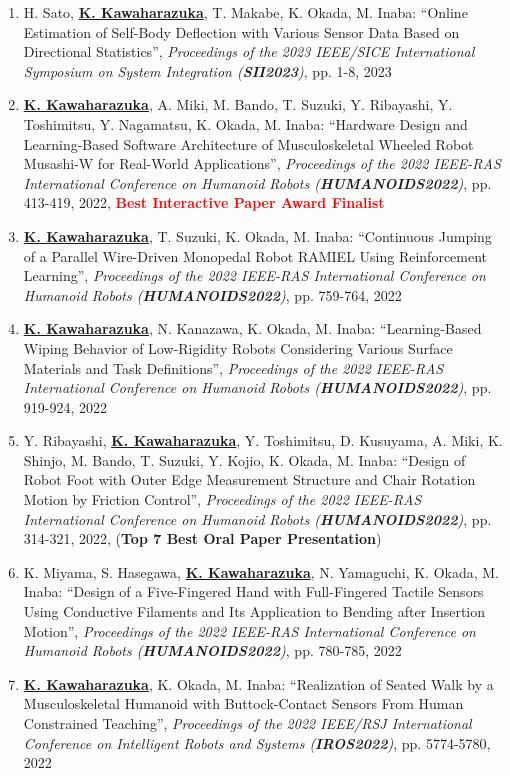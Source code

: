 \documentclass[letterpaper]{article}
\begin{document}
\begin{enumerate}
\item H. Sato, \underline{\textbf{K. Kawaharazuka}}, T. Makabe, K. Okada, M. Inaba: ``Online Estimation of Self-Body Deflection with Various Sensor Data Based on Directional Statistics'', \textit{Proceedings of the 2023 IEEE/SICE International Symposium on System Integration (\textit{\textbf{SII2023}})}, pp. 1-8, 2023
\item \underline{\textbf{K. Kawaharazuka}}, A. Miki, M. Bando, T. Suzuki, Y. Ribayashi, Y. Toshimitsu, Y. Nagamatsu, K. Okada, M. Inaba: ``Hardware Design and Learning-Based Software Architecture of Musculoskeletal Wheeled Robot Musashi-W for Real-World Applications'', \textit{Proceedings of the 2022 IEEE-RAS International Conference on Humanoid Robots (\textit{\textbf{HUMANOIDS2022}})}, pp. 413-419, 2022, \textbf{\textcolor{red}{Best Interactive Paper Award Finalist}}
\item \underline{\textbf{K. Kawaharazuka}}, T. Suzuki, K. Okada, M. Inaba: ``Continuous Jumping of a Parallel Wire-Driven Monopedal Robot RAMIEL Using Reinforcement Learning'', \textit{Proceedings of the 2022 IEEE-RAS International Conference on Humanoid Robots (\textit{\textbf{HUMANOIDS2022}})}, pp. 759-764, 2022
\item \underline{\textbf{K. Kawaharazuka}}, N. Kanazawa, K. Okada, M. Inaba: ``Learning-Based Wiping Behavior of Low-Rigidity Robots Considering Various Surface Materials and Task Definitions'', \textit{Proceedings of the 2022 IEEE-RAS International Conference on Humanoid Robots (\textit{\textbf{HUMANOIDS2022}})}, pp. 919-924, 2022
\item Y. Ribayashi, \underline{\textbf{K. Kawaharazuka}}, Y. Toshimitsu, D. Kusuyama, A. Miki, K. Shinjo, M. Bando, T. Suzuki, Y. Kojio, K. Okada, M. Inaba: ``Design of Robot Foot with Outer Edge Measurement Structure and Chair Rotation Motion by Friction Control'', \textit{Proceedings of the 2022 IEEE-RAS International Conference on Humanoid Robots (\textit{\textbf{HUMANOIDS2022}})}, pp. 314-321, 2022, (\textbf{Top 7 Best Oral Paper Presentation})
\item K. Miyama, S. Hasegawa, \underline{\textbf{K. Kawaharazuka}}, N. Yamaguchi, K. Okada, M. Inaba: ``Design of a Five-Fingered Hand with Full-Fingered Tactile Sensors Using Conductive Filaments and Its Application to Bending after Insertion Motion'', \textit{Proceedings of the 2022 IEEE-RAS International Conference on Humanoid Robots (\textit{\textbf{HUMANOIDS2022}})}, pp. 780-785, 2022
\item \underline{\textbf{K. Kawaharazuka}}, K. Okada, M. Inaba: ``Realization of Seated Walk by a Musculoskeletal Humanoid with Buttock-Contact Sensors From Human Constrained Teaching'', \textit{Proceedings of the 2022 IEEE/RSJ International Conference on Intelligent Robots and Systems (\textit{\textbf{IROS2022}})}, pp. 5774-5780, 2022

\end{enumerate}
\end{document}
